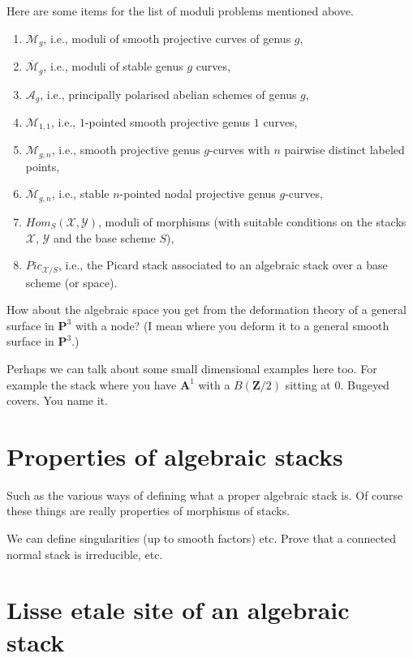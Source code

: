 \medskip\noindent
Here are some items for the list of moduli problems mentioned above.
\begin{enumerate}
\item $\mathcal{M}_g$, i.e., moduli of smooth projective curves of genus $g$,
\item $\overline{\mathcal{M}}_g$, i.e., moduli of stable genus $g$ curves,
\item $\mathcal{A}_{g}$,
i.e., principally polarised abelian schemes of genus $g$,
\item $\mathcal{M}_{1,1}$, i.e.,
$1$-pointed smooth projective genus $1$ curves,
\item $\mathcal{M}_{g, n}$, i.e., smooth projective genus $g$-curves
with $n$ pairwise distinct labeled points,
\item $\overline{\mathcal{M}}_{g, n}$, i.e., 
stable $n$-pointed nodal projective genus $g$-curves,
\item $\textit{Hom}_S(\mathcal{X},\mathcal{Y})$, moduli of morphisms
(with suitable conditions on the stacks $\mathcal{X}$, $\mathcal{Y}$
and the base scheme $S$),
\item $\textit{Pic}_{\mathcal{X}/S}$, i.e., the Picard stack associated
to an algebraic stack over a base scheme (or space).
\end{enumerate}

\medskip\noindent
How about the algebraic space you get from the deformation theory of
a general surface in $\mathbf{P}^3$ with a node? (I mean where you deform
it to a general smooth surface in $\mathbf{P}^3$.)

\medskip\noindent
Perhaps we can talk about some small dimensional examples here too.
For example the stack where you have $\mathbf{A}^1$ with a $B(\mathbf{Z}/2)$
sitting at $0$. Bugeyed covers. You name it.

\section{Properties of algebraic stacks}
\label{section-stacks-properties}

\noindent
Such as the various ways of defining what a proper algebraic stack is.
Of course these things are really properties of morphisms of stacks.

\medskip\noindent
We can define singularities (up to smooth factors) etc. Prove that a
connected normal stack is irreducible, etc.

\section{Lisse etale site of an algebraic stack}
\label{section-lisse-etale}

